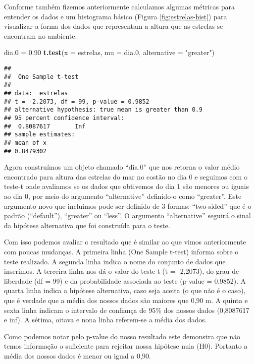 \documentclass[]{book}
\newenvironment{Shaded}{\begin{snugshade}}{\end{snugshade}}
\newcommand{\DataTypeTok}[1]{\textcolor[rgb]{0.13,0.29,0.53}{#1}}
\newcommand{\FloatTok}[1]{\textcolor[rgb]{0.00,0.00,0.81}{#1}}
\newcommand{\KeywordTok}[1]{\textcolor[rgb]{0.13,0.29,0.53}{\textbf{#1}}}
\newcommand{\NormalTok}[1]{#1}
\newcommand{\StringTok}[1]{\textcolor[rgb]{0.31,0.60,0.02}{#1}}
\begin{document}
Conforme também fizemos anteriormente calculamos algumas métricas para entender os dados e um histograma básico (Figura \ref{fig:estrelas-hist}) para visualizar a forma dos dados que representam a altura que as estrelas se encontram no ambiente.

\begin{Shaded}
\begin{Highlighting}[]
\NormalTok{dia}\FloatTok{.0}\NormalTok{ =}\StringTok{ }\FloatTok{0.90}
\KeywordTok{t.test}\NormalTok{(}\DataTypeTok{x =}\NormalTok{ estrelas, }\DataTypeTok{mu =}\NormalTok{ dia}\FloatTok{.0}\NormalTok{, }\DataTypeTok{alternative =} \StringTok{"greater"}\NormalTok{)}
\end{Highlighting}
\end{Shaded}

\begin{verbatim}
## 
##  One Sample t-test
## 
## data:  estrelas
## t = -2.2073, df = 99, p-value = 0.9852
## alternative hypothesis: true mean is greater than 0.9
## 95 percent confidence interval:
##  0.8087617       Inf
## sample estimates:
## mean of x 
## 0.8479302
\end{verbatim}

Agora construímos um objeto chamado ``dia.0'' que nos retorna o valor médio encontrado para altura das estrelas do mar no costão no dia 0 e seguimos com o teste-t onde avaliamos se os dados que obtivemos do dia 1 são menores ou iguais ao dia 0, por meio do argumento ``alternative'' definido-o como ``greater''. Este argumento novo que incluímos pode ser definido de 3 formas: ``two-sided'' que é o padrão (``default''), ``greater'' ou ``less''. O argumento ``alternative'' seguirá o sinal da hipótese alternativa que foi construída para o teste.

Com isso podemos avaliar o resultado que é similar ao que vimos anteriormente com poucas mudanças. A primeira linha (One Sample t-test) informa sobre o teste realizado. A segunda linha indica o nome do conjunto de dados que inserimos. A terceira linha nos dá o valor do teste-t (t = -2,2073), do grau de liberdade (df = 99) e da probabilidade associada ao teste (p-value = 0.9852). A quarta linha indica a hipótese alternativa, caso seja aceita (o que não é o caso), que é verdade que a média dos nossos dados são maiores que 0,90 m. A quinta e sexta linha indicam o intervalo de confiança de 95\% dos nossos dados (0,8087617 e inf). A sétima, oitava e nona linha referem-se a média dos dados.

Como podemos notar pelo p-value do nosso resultado este demonstra que não temos informação o suficiente para rejeitar nossa hipótese nula (H0). Portanto a média dos nossos dados é menor ou igual a 0,90.
\end{document}
